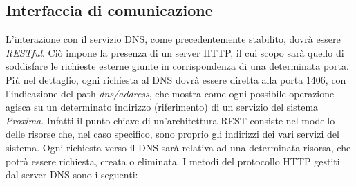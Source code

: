 \documentclass[a4paper,12pt]{report}
\begin{document}
\subsection{Interfaccia di comunicazione} \label{dns-communication}
L'interazione con il servizio DNS, come precedentemente stabilito, dovrà essere \emph{RESTful}. Ciò impone la presenza di un server HTTP, il cui scopo sarà quello di soddisfare le richieste esterne giunte in corrispondenza di una determinata porta. Più nel dettaglio, ogni richiesta al DNS dovrà essere diretta alla porta 1406, con l'indicazione del path \emph{dns/address}, che mostra come ogni possibile operazione agisca su un determinato indirizzo (riferimento) di un servizio del sistema \emph{Proxima}. Infatti il punto chiave di un'architettura REST consiste nel modello delle risorse che, nel caso specifico, sono proprio gli indirizzi dei vari servizi del sistema. Ogni richiesta verso il DNS sarà relativa ad una determinata risorsa, che potrà essere richiesta, creata o eliminata. I metodi del protocollo HTTP gestiti dal server DNS sono i seguenti:
\end{document}
